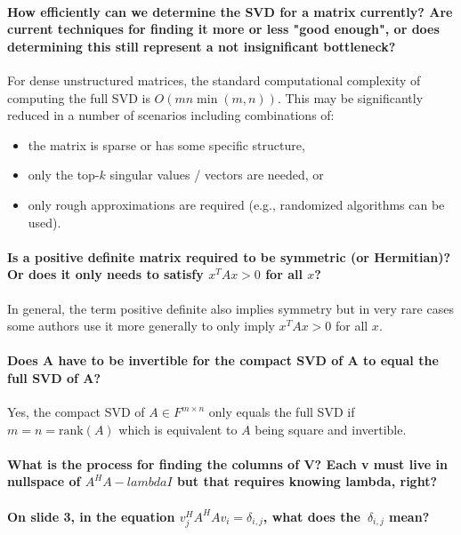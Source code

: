 \documentclass[10pt,english]{article}
\begin{document}
\paragraph{How efficiently can we determine the SVD for a matrix currently? Are current techniques for finding it more or less "good enough", or does determining this still represent a not insignificant bottleneck?}

For dense unstructured matrices, the standard computational complexity of computing the full SVD is $O(mn \min(m,n))$.
This may be significantly reduced in a number of scenarios including combinations of:
\begin{itemize}
\item the matrix is sparse or has some specific structure,
\item only the top-$k$ singular values / vectors are needed, or
\item only rough approximations are required (e.g., randomized algorithms can be used).
\end{itemize}



\paragraph{Is a positive definite matrix required to be symmetric (or Hermitian)? Or does it only needs to satisfy $x^T A x > 0$ for all $x$?}

In general, the term positive definite also implies symmetry but in very rare cases some authors use it more generally to only imply $x^T A x > 0$ for all $x$.

\paragraph{Does A have to be invertible for the compact SVD of A to equal the full SVD of A?}

Yes, the compact SVD of $A \in F^{m\times n}$ only equals the full SVD if $m=n=\text{rank}(A)$ which is equivalent to $A$ being square and invertible.

\paragraph{What is the process for finding the columns of V? Each v must live in nullspace of $A^H A - lambda I$ but that requires knowing lambda, right?}

\paragraph{On slide 3, in the equation $v_j^H A^H A v_i = \delta_{i,j}$, what does the $\delta_{i,j}$ mean?}
\end{document}
